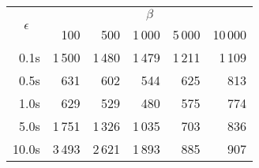 \begin{tabular}{rrrrrr}
\toprule
\multicolumn{1}{c}{\multirow[c]{2}{*}{$\epsilon$}} & \multicolumn{5}{c}{$\beta$} \\ \cmidrule(lr){2-6}
{} &  100   &  500   &  1\,000  &  5\,000  &  10\,000 \\
\midrule
0.1s  &   1\,500 &   1\,480 &   1\,479 &   1\,211 &   1\,109 \\
0.5s  &    631 &    602 &    544 &    625 &    813 \\
1.0s  &    629 &    529 &    480 &    575 &    774 \\
5.0s  &   1\,751 &   1\,326 &   1\,035 &    703 &    836 \\
10.0s &   3\,493 &   2\,621 &   1\,893 &    885 &    907 \\
\bottomrule
\end{tabular}


